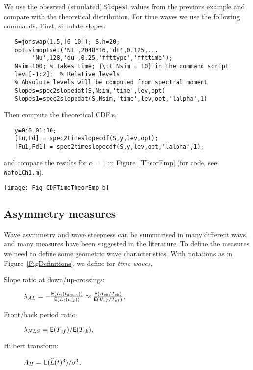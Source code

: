 We use the observed (simulated) {\tt Slopes1} values from the previous example and compare with the theoretical distribution. For time waves we use the following commands. First, simulate slopes:
{\small\begin{verbatim}
   S=jonswap(1.5,[6 10]); S.h=20;
   opt=simoptset('Nt',2048*16,'dt',0.125,...
        'Nu',128,'du',0.25,'ffttype','ffttime');
   Nsim=100; % Takes time; {\tt Nsim = 10} in the command script
   lev=[-1:2];  % Relative levels
   % Absolute levels will be computed from spectral moment
   Slopes=spec2slopedat(S,Nsim,'time',lev,opt)
   Slopes1=spec2slopedat(S,Nsim,'time',lev,opt,'lalpha',1)
\end{verbatim}
}
\noindent
Then compute the theoretical CDF:s,
{\small\begin{verbatim}
   y=0:0.01:10;
   [Fu,Fd] = spec2timeslopecdf(S,y,lev,opt);
   [Fu1,Fd1] = spec2timeslopecdf(S,y,lev,opt,'lalpha',1);
\end{verbatim}
}
\noindent
and compare the results for $\alpha = 1$ in Figure~\ref{TheorEmp} (for code, see {\tt WafoLCh1.m}).
\begin{SCfigure}[1.2]
\texttt{[image: Fig-CDFTimeTheorEmp\_b]}
\caption{CDF for up- and downcrossing (absolute values) slopes in asymmetric time waves with asymmetry parameter 
$\alpha=1$:
red = theoretical, blue = simulated, solid = upcrossing, dash-dotted = downcrossing. Crossed levels =
{\tt [-1 0 1 2]*standard deviation}. Outer curves = highest level.
}
\label{TheorEmp}
\end{SCfigure}

\subsection{Asymmetry measures}\label{ss:asymmetrymeasures}
Wave asymmetry and wave steepness can be summarised in many different ways,
and many measures have been suggested in the literature.
To define the measures we need to define some geometric wave characteristics.
With notations as in Figure~\ref{FigDefinitions}, we define for {\it time waves},
\begin{description}
\item[Slope ratio at down/up-crossings:] $\lambda_{AL} = -\frac{{\sf E}(L_t(t_{down}))}{{\sf E}(L_t(t_{up}))}
\approx \frac{{\sf E}(H_{cb}/T_{cb})}{{\sf E}(H_{cf}/T_{cf})}$, \label{LAL}
\item[Front/back period ratio:] $\lambda_{NLS} = {\sf E}(T_{cf})/{\sf E}(T_{cb}),$ \label{LNLS}
\item[Hilbert transform:] $A_H = {\sf E}(\widehat L (t)^3)/\sigma^3$. \label{AH}
\end{description}

